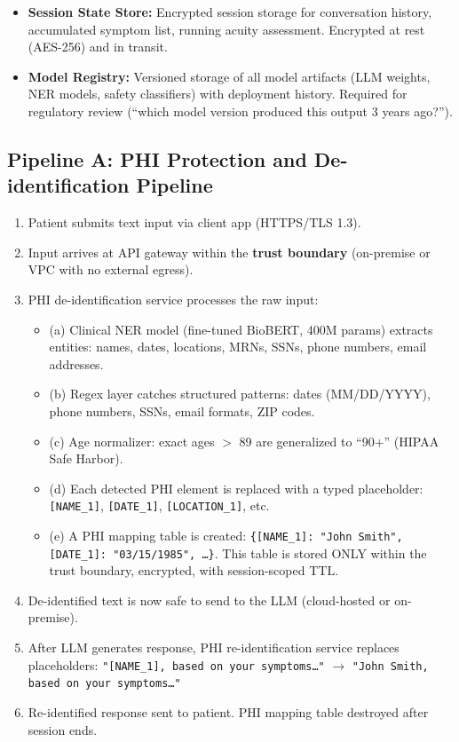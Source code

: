 \begin{itemize}
  \item \textbf{Session State Store:} Encrypted session storage for conversation history, accumulated symptom list, running acuity assessment. Encrypted at rest (AES-256) and in transit.
  \item \textbf{Model Registry:} Versioned storage of all model artifacts (LLM weights, NER models, safety classifiers) with deployment history. Required for regulatory review (``which model version produced this output 3 years ago?'').
\end{itemize}

\subsection*{Pipeline A: PHI Protection and De-identification Pipeline}
\begin{enumerate}
  \item Patient submits text input via client app (HTTPS/TLS 1.3).
  \item Input arrives at API gateway within the \textbf{trust boundary} (on-premise or VPC with no external egress).
  \item PHI de-identification service processes the raw input:
  \begin{itemize}
    \item (a) Clinical NER model (fine-tuned BioBERT, 400M params) extracts entities: names, dates, locations, MRNs, SSNs, phone numbers, email addresses.
    \item (b) Regex layer catches structured patterns: dates (MM/DD/YYYY), phone numbers, SSNs, email formats, ZIP codes.
    \item (c) Age normalizer: exact ages $>$ 89 are generalized to ``90+'' (HIPAA Safe Harbor).
    \item (d) Each detected PHI element is replaced with a typed placeholder: \texttt{[NAME\_1]}, \texttt{[DATE\_1]}, \texttt{[LOCATION\_1]}, etc.
    \item (e) A PHI mapping table is created: \texttt{\{[NAME\_1]: "John Smith", [DATE\_1]: "03/15/1985", \ldots\}}. This table is stored ONLY within the trust boundary, encrypted, with session-scoped TTL.
  \end{itemize}
  \item De-identified text is now safe to send to the LLM (cloud-hosted or on-premise).
  \item After LLM generates response, PHI re-identification service replaces placeholders: \texttt{"[NAME\_1], based on your symptoms\ldots"} $\rightarrow$ \texttt{"John Smith, based on your symptoms\ldots"}
  \item Re-identified response sent to patient. PHI mapping table destroyed after session ends.
\end{enumerate}

